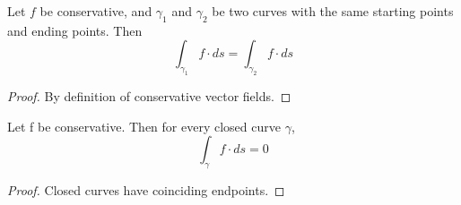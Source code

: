 \documentclass[11pt,openany]{book}
\newcommand{\proposition}[1]{\begin{tcolorbox}[title=Proposition,colframe=gray]{#1}\end{tcolorbox}
}
\begin{document}
	\proposition{
	Let $f$ be conservative, and $\gamma_1$ and $\gamma_2$ be two curves with the same starting points and ending points. Then \[
		\int_{\gamma_1} f \cdot ds = \int_{\gamma_2} f \cdot ds
	\]
	}
	\begin{proof}
		By definition of conservative vector fields.
	\end{proof}
	
	\proposition{
		Let f be conservative. Then for every closed curve $\gamma$,
		\[
			\int_\gamma f\cdot ds = 0
		\]
	}
	\begin{proof}
		Closed curves have coinciding endpoints.
	\end{proof}
\end{document}
